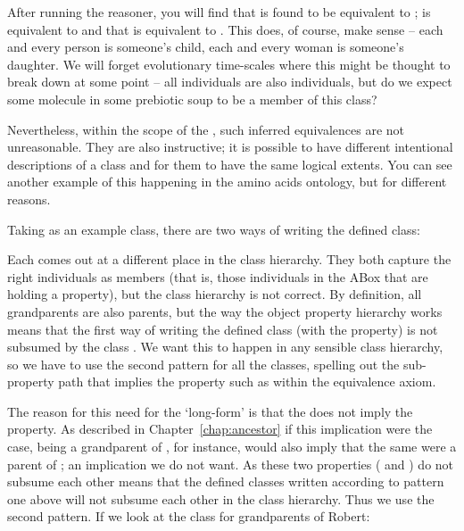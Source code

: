 After running the reasoner, you will find that  is found to be equivalent to ;  is equivalent to  and that  is equivalent to . This does, of course, make sense -- each and every person is someone's child, each and every woman is someone's daughter. We will forget evolutionary time-scales where this might be thought to break down at some point -- all  individuals are also  individuals, but do we expect some molecule in some prebiotic soup to be a member of this class?

Nevertheless, within the scope of the \fhkb, such inferred equivalences are not unreasonable. They are also instructive; it is possible to have different intentional descriptions of a class and for them to have the same logical extents. You can see another example of this happening in the amino acids ontology, but for different reasons.

Taking  as an example class, there are two ways of writing the defined class:


Each comes out at a different place in the class hierarchy. They both capture the right individuals as members (that is, those individuals in the ABox that are holding a  property), but the class hierarchy is not correct. By definition, all grandparents are also parents, but the way the object property hierarchy works means that the first way of writing the defined class (with the  property) is not subsumed by the class . We want this to happen in any sensible class hierarchy, so we have to use the second pattern for all the classes, spelling out the sub-property path that implies the property such as  within the equivalence axiom.

The reason for this need for the `long-form' is that the  does not imply the  property. As described in Chapter~\ref{chap:ancestor} if this implication were the case, being a grandparent of \rds, for instance, would also imply that the same \person were a parent of \rds; an implication we do not want. As these two properties ( and ) do not subsume each other means that the defined classes written according to pattern one above will not subsume each other in the class hierarchy. Thus we use the second pattern.
If we look at the class for grandparents of Robert:

